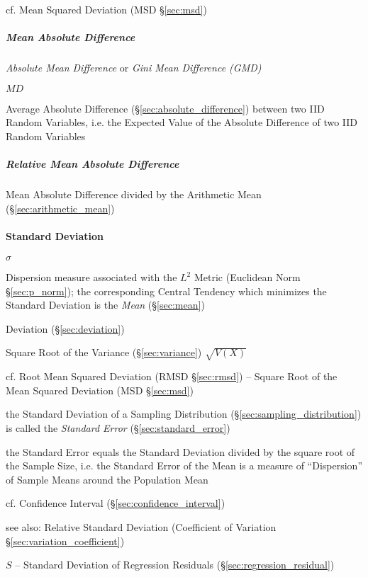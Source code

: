cf. Mean Squared Deviation (MSD \S\ref{sec:msd})



\subparagraph{Mean Absolute Difference}
\label{sec:mean_absolute_difference}\hfill

\emph{Absolute Mean Difference} or \emph{Gini Mean Difference (GMD)}

$MD$

Average Absolute Difference (\S\ref{sec:absolute_difference}) between two IID
Random Variables, i.e. the Expected Value of the Absolute Difference of two IID
Random Variables



\subparagraph{Relative Mean Absolute Difference}
\label{sec:relative_mean_absolute_difference}\hfill

Mean Absolute Difference divided by the Arithmetic Mean
(\S\ref{sec:arithmetic_mean})



\paragraph{Standard Deviation}\label{sec:standard_deviation}\hfill

$\sigma$

Dispersion measure associated with the $L^2$ Metric (Euclidean Norm
\S\ref{sec:p_norm}); the corresponding Central Tendency which minimizes the
Standard Deviation is the \emph{Mean} (\S\ref{sec:mean})

Deviation (\S\ref{sec:deviation})

Square Root of the Variance (\S\ref{sec:variance}) $\sqrt{V(X)}$

cf. Root Mean Squared Deviation (RMSD \S\ref{sec:rmsd}) -- Square Root of the
Mean Squared Deviation (MSD \S\ref{sec:msd})

the Standard Deviation of a Sampling Distribution
(\S\ref{sec:sampling_distribution}) is called the \emph{Standard Error}
(\S\ref{sec:standard_error})

the Standard Error equals the Standard Deviation divided by the square root of
the Sample Size, i.e. the Standard Error of the Mean is a measure of
``Dispersion'' of Sample Means around the Population Mean

cf. Confidence Interval (\S\ref{sec:confidence_interval})

see also: Relative Standard Deviation (Coefficient of Variation
\S\ref{sec:variation_coefficient})

$S$ -- Standard Deviation of Regression Residuals
(\S\ref{sec:regression_residual})

